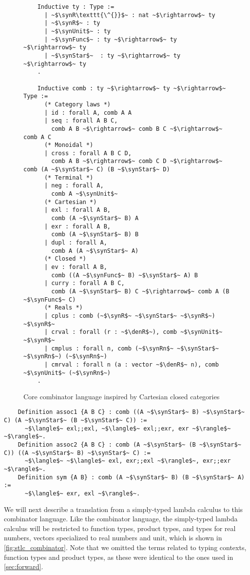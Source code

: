   \begin{figure}[]
    \centering
    \begin{verbatim}
    Inductive ty : Type :=
      | ~$\synR\texttt{\^{}}$~ : nat ~$\rightarrow$~ ty
      | ~$\synR$~ : ty
      | ~$\synUnit$~ : ty
      | ~$\synFunc$~ : ty ~$\rightarrow$~ ty ~$\rightarrow$~ ty
      | ~$\synStar$~  : ty ~$\rightarrow$~ ty ~$\rightarrow$~ ty
    .

    Inductive comb : ty ~$\rightarrow$~ ty ~$\rightarrow$~ Type :=
      (* Category laws *)
      | id : forall A, comb A A
      | seq : forall A B C,
        comb A B ~$\rightarrow$~ comb B C ~$\rightarrow$~ comb A C
      (* Monoidal *)
      | cross : forall A B C D,
        comb A B ~$\rightarrow$~ comb C D ~$\rightarrow$~ comb (A ~$\synStar$~ C) (B ~$\synStar$~ D)
      (* Terminal *)
      | neg : forall A,
        comb A ~$\synUnit$~
      (* Cartesian *)
      | exl : forall A B,
        comb (A ~$\synStar$~ B) A
      | exr : forall A B,
        comb (A ~$\synStar$~ B) B
      | dupl : forall A,
        comb A (A ~$\synStar$~ A)
      (* Closed *)
      | ev : forall A B,
        comb ((A ~$\synFunc$~ B) ~$\synStar$~ A) B
      | curry : forall A B C,
        comb (A ~$\synStar$~ B) C ~$\rightarrow$~ comb A (B ~$\synFunc$~ C)
      (* Reals *)
      | cplus : comb (~$\synR$~ ~$\synStar$~ ~$\synR$~) ~$\synR$~
      | crval : forall (r : ~$\denR$~), comb ~$\synUnit$~ ~$\synR$~
      | cmplus : forall n, comb (~$\synRn$~ ~$\synStar$~ ~$\synRn$~) (~$\synRn$~)
      | cmrval : forall n (a : vector ~$\denR$~ n), comb ~$\synUnit$~ (~$\synRn$~)
    .
    \end{verbatim}
    \caption{Core combinator language inspired by Cartesian closed categories}
    \label{fig:combinator_core_lang}
  \end{figure}

  \begin{verbatim}
    Definition assoc1 {A B C} : comb ((A ~$\synStar$~ B) ~$\synStar$~ C) (A ~$\synStar$~ (B ~$\synStar$~ C)) :=
      ~$\langle$~ exl;;exl, ~$\langle$~ exl;;exr, exr ~$\rangle$~ ~$\rangle$~.
    Definition assoc2 {A B C} : comb (A ~$\synStar$~ (B ~$\synStar$~ C)) ((A ~$\synStar$~ B) ~$\synStar$~ C) :=
      ~$\langle$~ ~$\langle$~ exl, exr;;exl ~$\rangle$~, exr;;exr ~$\rangle$~.
    Definition sym {A B} : comb (A ~$\synStar$~ B) (B ~$\synStar$~ A) :=
      ~$\langle$~ exr, exl ~$\rangle$~.
  \end{verbatim}

  We will next describe a translation from a simply-typed lambda calculus to this combinator language.
  Like the combinator language, the simply-typed lambda calculus will be restricted to function types, product types, and types for real numbers, vectors specialized to real numbers and unit, which is shown in \cref{fig:stlc_combinator}.
  Note that we omitted the terms related to typing contexts, function types and product types, as these were identical to the ones used in \cref{sec:forward}.

